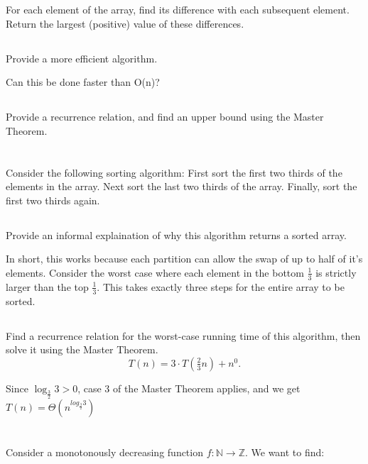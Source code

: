 \documentclass{amsart}
\theoremstyle{definition}
\theoremstyle{remark}
\numberwithin{equation}{section}
\newcommand{\NN}{\mathbb N}
\newcommand{\ZZ}{\mathbb Z}
\begin{document}
For each element of the array, find its difference with each subsequent element. Return the largest (positive) value of these differences.

\subsection{} Provide a more efficient algorithm.

Can this be done faster than O(n)?

\subsection{} Provide a recurrence relation, and find an upper bound
using the Master Theorem.

\section{} Consider the following sorting algorithm: First sort the
first two thirds of the elements in the array. Next sort the last two
thirds of the array. Finally, sort the first two thirds again.

\subsection{} Provide an informal explaination of why this algorithm returns a
sorted array.

In short, this works because each partition can allow the swap of up to half of it's elements. Consider the worst case where each element in the bottom $\frac{1}{3}$ is strictly larger than the top $\frac{1}{3}$. This takes exactly three steps for the entire array to be sorted.


\subsection*{} Find a recurrence relation for the worst-case running time of this algorithm, then solve it using the Master Theorem.
$$ T(n) = 3 \cdot T( \tfrac{2}{3} n) + n^0. $$

Since $\log_{\frac{3}{2}} {3} > 0$, case 3 of the Master Theorem applies, and we get
$T(n) = \Theta ( n^{log_{\frac{3}{2}} {3}} )$


\section{} Consider a monotonously decreasing function $f : \NN \rightarrow \ZZ$. We want to find:
\end{document}
